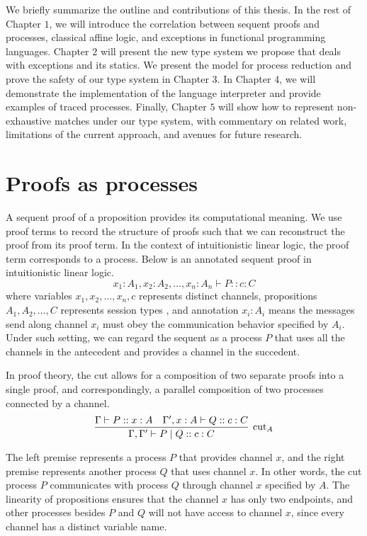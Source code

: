 \documentclass[12pt, openany]{memoir}
\begin{document}
We briefly summarize the outline and contributions of this thesis.
In the rest of Chapter $1$, we will introduce the correlation between sequent proofs and processes, classical affine logic, and exceptions in functional programming languages.
Chapter $2$ will present the new type system we propose that deals with exceptions and its statics.
We present the model for process reduction and prove the safety of our type system in Chapter $3$.
In Chapter 4, we will demonstrate the implementation of the language interpreter and provide examples of traced processes.
Finally, Chapter $5$ will show how to represent non-exhaustive matches under our type system, with commentary on related work, limitations of the current approach, and avenues for future research.
\section{Proofs as processes} 
A sequent proof of a proposition provides its computational meaning.
We use proof terms to record the structure of proofs such that we can reconstruct the proof from its proof term.
In the context of intuitionistic linear logic, the proof term corresponds to a process. 
Below is an annotated sequent proof in intuitionistic linear logic.
\[
  x_1 : A_1, x_2 : A_2, \ldots, x_n : A_n \vdash P :: c : C
\]
where variables $x_1, x_2, \ldots, x_n, c$ represents distinct channels, propositions $A_1, A_2, \ldots, C$ represents session types \cite{Caires2010}, 
and annotation $x_i : A_i$ means the messages send along channel $x_i$ must obey the communication behavior specified by $A_i$.
Under such setting, we can regard the sequent as a process $P$ that uses all the channels in the antecedent and provides a channel in the succedent.

In proof theory, the cut allows for a composition of two separate proofs into a single proof, and correspondingly, a parallel composition of two processes connected by a channel.
\[
  \infer[\text{cut}_A]{\Gamma, \Gamma' \vdash P \mid Q :: c : C}{
    \Gamma \vdash P :: x : A
    &
    \Gamma', x : A \vdash Q :: c : C
  }
\]

The left premise represents a process $P$ that provides channel $x$, and the right premise represents another process $Q$ that uses channel $x$. 
In other words, the cut process $P$ communicates with process $Q$ through channel $x$ specified by $A$. 
The linearity of propositions ensures that the channel $x$ has only two endpoints, 
and other processes besides $P$ and $Q$ will not have access to channel $x$, 
since every channel has a distinct variable name.
\end{document}
